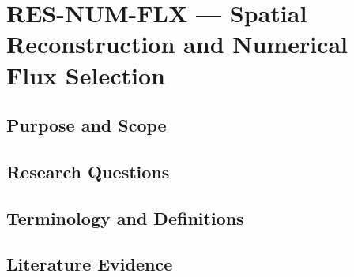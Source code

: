 
\section{RES-NUM-FLX --- Spatial Reconstruction and Numerical Flux Selection}
\label{sec:res-num-flx}

\subsection{Purpose and Scope}
\label{sec:res-num-flx-purpose}


\subsection{Research Questions}
\label{sec:res-num-flx-research-questions}


\subsection{Terminology and Definitions}
\label{sec:res-num-flx-definitions}


\subsection{Literature Evidence}
\label{sec:res-num-flx-literature-evidence}

%


